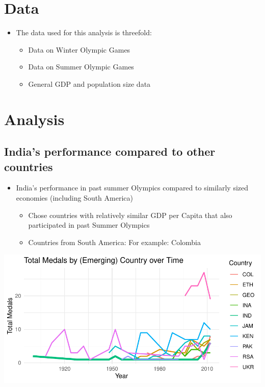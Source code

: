 \documentclass[11pt,preprint, authoryear]{elsarticle}
\let\origfigure\figure
\let\endorigfigure\endfigure
\renewenvironment{figure}[1][2] {
    \expandafter\origfigure\expandafter[H]
} {
    \endorigfigure
}
\numberwithin{equation}{section}
\numberwithin{figure}{section}
\numberwithin{table}{section}
\def\tightlist{} %
\begin{document}
\hypertarget{data}{%
\section{Data}\label{data}}

\begin{itemize}
\tightlist
\item
  The data used for this analysis is threefold:

  \begin{itemize}
  \tightlist
  \item
    Data on Winter Olympic Games
  \item
    Data on Summer Olympic Games
  \item
    General GDP and population size data
  \end{itemize}
\end{itemize}

\hypertarget{analysis}{%
\section{Analysis}\label{analysis}}

\hypertarget{indias-performance-compared-to-other-countries}{%
\subsection{India's performance compared to other
countries}\label{indias-performance-compared-to-other-countries}}

\begin{itemize}
\item
  India's performance in past summer Olympics compared to similarly
  sized economies (including South America)

  \begin{itemize}
  \tightlist
  \item
    Chose countries with relatively similar GDP per Capita that also
    participated in past Summer Olympics
  \item
    Countries from South America: For example: Colombia
  \end{itemize}
\end{itemize}

\begin{figure}[H]

{\centering \includegraphics{Question4_files/figure-latex/Figure1-1} 

}

\caption{Medals Table for Emerging Country over Time \label{Figure1}}\label{fig:Figure1}
\end{figure}
\end{document}
